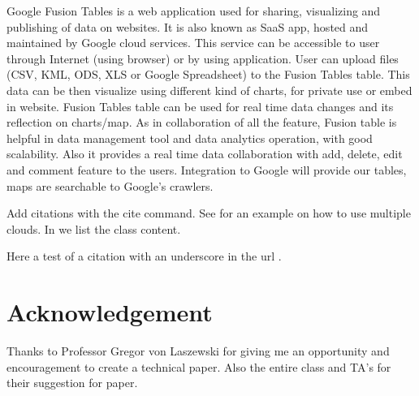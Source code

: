\documentclass[9pt,twocolumn,twoside]{styles/osajnl}
\begin{document}
Google Fusion Tables is a web application used for sharing, visualizing and publishing of data on websites. It is also known as SaaS app, hosted and maintained by Google cloud services. This service can be accessible to user through Internet (using browser) or by using application. User can upload files (CSV, KML, ODS, XLS or Google Spreadsheet) to the Fusion Tables table. This data can be then visualize using different kind of charts, for private use or embed in website. Fusion Tables table can be used for real time data changes and its reflection on charts/map. As in collaboration of all the feature, Fusion table is helpful in data management tool and data analytics operation, with good scalability. Also it provides a real time data collaboration with add, delete, edit and comment feature to the users. Integration to Google will provide our tables, maps are searchable to Google’s crawlers.  


\noindent Add citations with the cite command. See
\cite{las14cloudmeshmultiple} for an example on how to use multiple
clouds. In \cite{www-i524} we list the class content.

Here a test of a citation with an underscore in the url \cite{www-underscore}.

\section{Acknowledgement}


Thanks to Professor Gregor von Laszewski for giving me an opportunity and encouragement to create a technical paper.
Also the entire class and TA's for their suggestion for paper.



 
\end{document}
